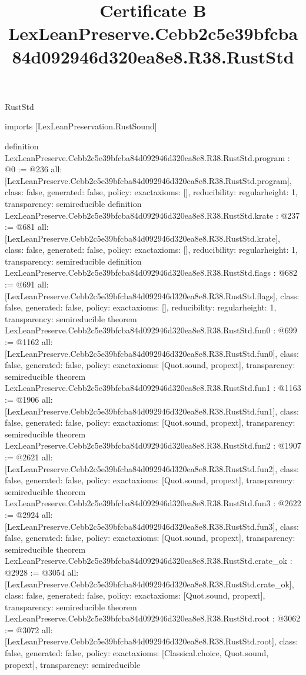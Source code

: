 \begin{lexlean}{RustStd}
\title{Certificate B LexLeanPreserve.Cebb2c5e39bfcba84d092946d320ea8e8.R38.RustStd}
\begin{coremodule}
imports [LexLeanPreservation.RustSound]

definition LexLeanPreserve.Cebb2c5e39bfcba84d092946d320ea8e8.R38.RustStd.program : @0 := @236 {
  all: [LexLeanPreserve.Cebb2c5e39bfcba84d092946d320ea8e8.R38.RustStd.program],
  class: false,
  generated: false,
  policy: exact{axioms: []},
  reducibility: regular{height: 1},
  transparency: semireducible
}
definition LexLeanPreserve.Cebb2c5e39bfcba84d092946d320ea8e8.R38.RustStd.krate : @237 := @681 {
  all: [LexLeanPreserve.Cebb2c5e39bfcba84d092946d320ea8e8.R38.RustStd.krate],
  class: false,
  generated: false,
  policy: exact{axioms: []},
  reducibility: regular{height: 1},
  transparency: semireducible
}
definition LexLeanPreserve.Cebb2c5e39bfcba84d092946d320ea8e8.R38.RustStd.flags : @682 := @691 {
  all: [LexLeanPreserve.Cebb2c5e39bfcba84d092946d320ea8e8.R38.RustStd.flags],
  class: false,
  generated: false,
  policy: exact{axioms: []},
  reducibility: regular{height: 1},
  transparency: semireducible
}
theorem LexLeanPreserve.Cebb2c5e39bfcba84d092946d320ea8e8.R38.RustStd.fun0 : @699 := @1162 {
  all: [LexLeanPreserve.Cebb2c5e39bfcba84d092946d320ea8e8.R38.RustStd.fun0],
  class: false,
  generated: false,
  policy: exact{axioms: [Quot.sound, propext]},
  transparency: semireducible
}
theorem LexLeanPreserve.Cebb2c5e39bfcba84d092946d320ea8e8.R38.RustStd.fun1 : @1163 := @1906 {
  all: [LexLeanPreserve.Cebb2c5e39bfcba84d092946d320ea8e8.R38.RustStd.fun1],
  class: false,
  generated: false,
  policy: exact{axioms: [Quot.sound, propext]},
  transparency: semireducible
}
theorem LexLeanPreserve.Cebb2c5e39bfcba84d092946d320ea8e8.R38.RustStd.fun2 : @1907 := @2621 {
  all: [LexLeanPreserve.Cebb2c5e39bfcba84d092946d320ea8e8.R38.RustStd.fun2],
  class: false,
  generated: false,
  policy: exact{axioms: [Quot.sound, propext]},
  transparency: semireducible
}
theorem LexLeanPreserve.Cebb2c5e39bfcba84d092946d320ea8e8.R38.RustStd.fun3 : @2622 := @2924 {
  all: [LexLeanPreserve.Cebb2c5e39bfcba84d092946d320ea8e8.R38.RustStd.fun3],
  class: false,
  generated: false,
  policy: exact{axioms: [Quot.sound, propext]},
  transparency: semireducible
}
theorem LexLeanPreserve.Cebb2c5e39bfcba84d092946d320ea8e8.R38.RustStd.crate_ok : @2928 := @3054 {
  all: [LexLeanPreserve.Cebb2c5e39bfcba84d092946d320ea8e8.R38.RustStd.crate_ok],
  class: false,
  generated: false,
  policy: exact{axioms: [Quot.sound, propext]},
  transparency: semireducible
}
theorem LexLeanPreserve.Cebb2c5e39bfcba84d092946d320ea8e8.R38.RustStd.root : @3062 := @3072 {
  all: [LexLeanPreserve.Cebb2c5e39bfcba84d092946d320ea8e8.R38.RustStd.root],
  class: false,
  generated: false,
  policy: exact{axioms: [Classical.choice, Quot.sound, propext]},
  transparency: semireducible
}


\end{coremodule}
\end{lexlean}
